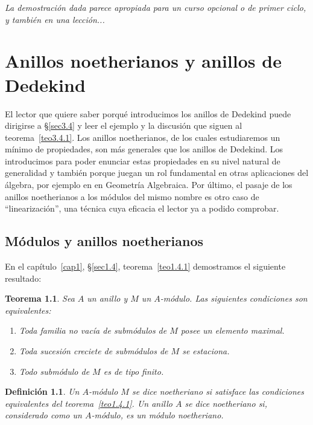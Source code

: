 \documentclass[10pt,oneside,bibtotoc,smallheadings,leqno,a5paper,DIV=12]{scrbook}
\numberwithin{equation}{section}
\newenvironment{comm}%
	{\begin{trivlist}\item\small\itshape}
	{\end{trivlist}}
\theoremstyle{defi}
\newtheorem{definition}{Definici\'on}
\theoremstyle{enonce}
\newtheorem{theorem}{Teorema}
\theoremstyle{rem}
\numberwithin{theorem}{section}
\numberwithin{proposition}{section}
\numberwithin{definition}{section}
\numberwithin{lemma}{section}
\numberwithin{corollary}{section}
\numberwithin{example}{section}
\numberwithin{footnote}{section}%
\begin{document}
\begin{comm}
La demostraci\'on dada parece apropiada para un curso opcional o de primer ciclo, y tambi\'en
en una lecci\'on...
\end{comm}

\chapter{Anillos noetherianos y anillos de Dedekind}\label{cap3}

El lector que quiere saber porqu\'e introducimos los anillos de Dedekind puede dirigirse
a \S\ref{sec3.4} y leer el ejemplo y la discusi\'on que siguen al teorema~\ref{teo3.4.1}.
Los anillos noetherianos, de los cuales estudiaremos un m\'inimo de propiedades, son m\'as generales que los
anillos de Dedekind. Los introducimos para poder enunciar estas propiedades en su
nivel natural de generalidad y tambi\'en porque juegan un rol fundamental en otras aplicaciones
del \'algebra, por ejemplo en en Geometr\'ia Algebraica. Por \'ultimo, el pasaje de los anillos noetherianos
a los m\'odulos del mismo nombre es otro caso de ``linearizaci\'on'', una t\'ecnica cuya eficacia
el lector ya a podido comprobar.

\section{M\'odulos y anillos noetherianos}\label{sec3.1}

En el cap\'itulo~\ref{cap1}, \S\ref{sec1.4}, teorema~\ref{teo1.4.1} demostramos el siguiente resultado:

\begin{theorem}\label{teo3.1.1}
Sea $A$ un anillo y $M$ un $A$-m\'odulo. Las siguientes condiciones son equivalentes:
\begin{enumerate}
\item[a)] Toda familia no vac\'ia de subm\'odulos de $M$ posee un elemento maximal.
\item[b)] Toda sucesi\'on creciete de subm\'odulos de $M$ se estaciona.
\item[c)] Todo subm\'odulo de $M$ es de tipo finito.
\end{enumerate}
\end{theorem}

\begin{definition}
Un $A$-m\'odulo $M$ se dice noetheriano si satisface las condiciones equivalentes del
teorema~\ref{teo1.4.1}. Un anillo $A$ se dice noetheriano si, considerado como un $A$-m\'odulo, es
un m\'odulo noetheriano.
\end{definition}
\end{document}
